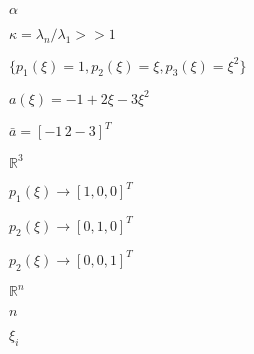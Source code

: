 \documentclass[10pt]{book}
\begin{document}
\begin{mdSnippets}
\begin{mdInlineSnippet}[7b7f9dbfea05c83784f8b85149852f08]%
$\alpha$\end{mdInlineSnippet}%
\begin{mdInlineSnippet}[86b98c5b0c7d04867c5ca926140227ab]%
$\kappa=\lambda_n/\lambda_1 >> 1$\end{mdInlineSnippet}%
\begin{mdInlineSnippet}[3f2d67e161ece4d43c3a5de32b624a95]%
$\{p_1(\xi)=1,p_2(\xi)=\xi,p_3(\xi)=\xi^2\}$\end{mdInlineSnippet}%
\begin{mdInlineSnippet}[9999d80572c6085a05109d0949e7461a]%
$a(\xi)=-1+2\xi-3\xi^2$\end{mdInlineSnippet}%
\begin{mdInlineSnippet}%
$\bar{a}=[-1\,2-3]^T$\end{mdInlineSnippet}%
\begin{mdInlineSnippet}%
$\mathbb{R}^3$\end{mdInlineSnippet}%
\begin{mdInlineSnippet}[42300e8f224f0215551dca830f8ea6e4]%
$p_1(\xi)\rightarrow [1,0,0]^T$\end{mdInlineSnippet}%
\begin{mdInlineSnippet}%
$p_2(\xi)\rightarrow [0,1,0]^T$\end{mdInlineSnippet}%
\begin{mdInlineSnippet}[2db85da8a691ef9d76ef18fbad87ff76]%
$p_2(\xi)\rightarrow [0,0,1]^T$\end{mdInlineSnippet}%
\begin{mdInlineSnippet}[cf048f74f71721abd7b8df49453d1310]%
$\mathbb{R}^n$\end{mdInlineSnippet}%
\begin{mdInlineSnippet}[7b8b965ad4bca0e41ab51de7b31363a1]%
$n$\end{mdInlineSnippet}%
\begin{mdInlineSnippet}[9ea888f58114108ed02fea555f01fe8c]%
$\xi_i$\end{mdInlineSnippet}%
\begin{mdInlineSnippet}[d247f594c78d0d2be10fc6d82512cc4e]%

\end{mdInlineSnippet}
\end{mdSnippets}
\end{document}
